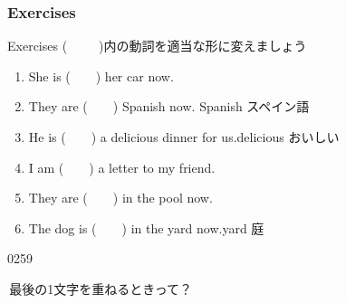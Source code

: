 \documentclass[aspectratio=169,xcolor={dvipsnames,table}]{beamer}
\newcommand{\myaudio}[1]{\href{#1}{\faVolumeUp}}
\begin{document}
\subsubsection{Exercises}
\begin{frame}[plain]{Exercises}
(~~~~~)内の動詞を適当な形に変えましょう
\begin{enumerate}
 \item She is (~~~~) her car now.
 \item They are (~~~~) Spanish now. \hfill{\scriptsize Spanish  スペイン語}
 \item He is  (~~~~) a delicious dinner for us.\hfill{\scriptsize  delicious  おいしい}
 \item I am (~~~~) a letter to my friend.
 \item They are (~~~~) in the pool now.
 \item The dog is (~~~~) in the yard now.\hfill{\scriptsize yard  庭}
\end{enumerate} 

\hfill{\tiny 0259}\,{\scriptsize \myaudio{./audio/021_is_ing_intro_04.mp3}}
\end{frame}
\begin{frame}[plain]
 
\Large

\textdbend\,最後の1文字を重ねるときって？
\end{frame}
\end{document}
